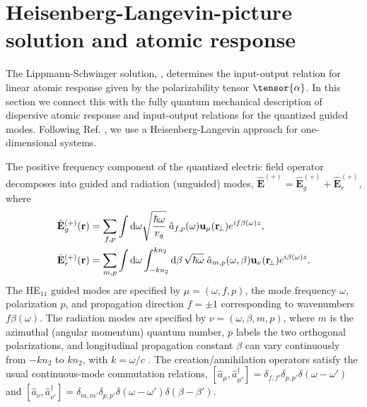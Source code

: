 \documentclass[aps,pra,twocolumn]{revtex4-1} %
\newcommand{\awg}{\hat{a}_{f,p}(\omega)}
\newcommand{\awr}{\hat{a}_{m,p}(\omega,\beta)}
\begin{document}
	
\section{Heisenberg-Langevin-picture solution and atomic response} \label{Sec::HeisenbergLangevin}
	
The Lippmann-Schwinger solution, , determines the input-output relation for linear atomic response given by the polarizability tensor $\tensor{\alpha}$.  
In this section we connect this with the fully quantum mechanical description of dispersive atomic response and input-output relations for the quantized guided modes.  
Following Ref. \cite{le_kien_spontaneous_2005}, we use a Heisenberg-Langevin approach for one-dimensional systems.  

The positive frequency component of the quantized electric field operator decomposes into guided and radiation (unguided) modes, $\hat{\mathbf{E}}^{(+)}=\hat{\mathbf{E}}_g^{(+)}+\hat{\mathbf{E}}_{r}^{(+)}$, where
	\begin{align}
		\hat{\mathbf{E}}_g^{(+)}(\br) &= \sum_{f,p} \int \mathrm{d}\omega  \sqrt{\frac{ \hbar \omega}{ v_g}} \; \awg \mathbf{u}_\mu (\br\!_\perp) e^{i f\beta(\omega) z } ,\label{Eq::QuantizedElectricField} \\
		\hat{\mathbf{E}}_r^{(+)}(\br) &= \sum_{m,p} \int \mathrm{d}\omega   \int_{-kn_2}^{kn_2}\mathrm{d}\beta \, \sqrt{ \hbar \omega}\;\awr \mathbf{u}_\nu (\br\!_\perp) e^{i\beta(\omega) z }.
	\end{align}
The HE$_{11}$ guided modes are specified by $\mu =(\omega, f, p)$, the mode frequency $\omega$,  polarization $p$, and propagation direction $f=\pm1$ corresponding to wavenumbers $f\beta (\omega)$.  
The radiation modes are specified by  $\nu=(\omega, \beta, m, p)$, where $m$ is the azimuthal (angular momentum) quantum number, $p$ labels the two orthogonal polarizations, and longitudinal propagation constant $\beta$ can vary continuously from $-kn_2$ to $kn_2$, with $k = \omega/c$ \cite{sondergaard_general_2001,le_kien_spontaneous_2005}.  
The creation/annihilation operators satisfy the usual continuous-mode commutation relations, $[\hat{a}_\mu, \hat{a}^\dag_{\mu'} ] = \delta_{f,f'} \delta_{p,p'} \delta ( \omega - \omega ') $ and $[\hat{a}_\nu ,\hat{a}^\dag_{\nu'} ] = \delta_{m,m'} \delta_{p,p'} \delta ( \omega - \omega ')  \delta ( \beta - \beta') $.
\end{document}
